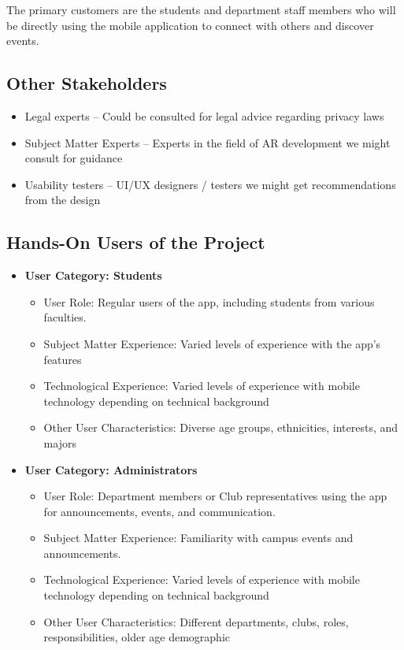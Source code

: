 \documentclass[12pt]{article}
\begin{document}
The primary customers are the students and department staff members who will be directly using the mobile application to connect with others and discover events.

\subsection{Other Stakeholders}

\begin{itemize}
\item Legal experts – Could be consulted for legal advice regarding privacy laws
\item Subject Matter Experts – Experts in the field of AR development we might consult for guidance
\item Usability testers – UI/UX designers / testers we might get recommendations from the design
\end{itemize}

\subsection{Hands-On Users of the Project}
\begin{itemize}
 \item \textbf{User Category: Students}
\begin{itemize}
\item User Role: Regular users of the app, including students from various faculties.

\item Subject Matter Experience: Varied levels of experience with the app's features

\item Technological Experience: Varied levels of experience with mobile technology depending on technical background

\item Other User Characteristics: Diverse age groups, ethnicities, interests, and majors
\end{itemize}


\item \textbf{User Category: Administrators}
\begin{itemize}
\item User Role: Department members or Club representatives using the app for announcements, events, and communication.

\item Subject Matter Experience: Familiarity with campus events and announcements.

\item Technological Experience: Varied levels of experience with mobile technology depending on technical background

\item Other User Characteristics: Different departments, clubs, roles, responsibilities, older age demographic
\end{itemize}
\end{itemize}
\end{document}
